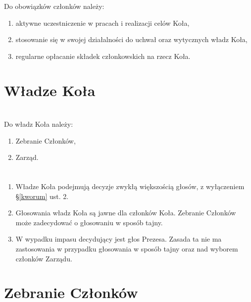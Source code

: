 \documentclass[a4paper]{article}
\begin{document}
\section{}
Do obowiązków członków należy:
\begin{enumerate}[label=\alph*)]
\item aktywne uczestniczenie w pracach i realizacji celów Koła,
\item stosowanie się w swojej działalności do uchwał oraz wytycznych władz Koła,
\item regularne opłacanie składek członkowskich na rzecz Koła.
\end{enumerate}

\section*{Władze Koła~~~}
\section{}

Do władz Koła należy:
\begin{enumerate}[label=\alph*)]
\item Zebranie Członków,
\item Zarząd.
\end{enumerate}

\section{}
\begin{enumerate}
\item Władze Koła podejmują decyzje zwykłą większością głosów, z wyłączeniem \S \ref{kworum} ust. 2.
\item Głosowania władz Koła są jawne dla członków Koła. Zebranie Członków może zadecydować o głosowaniu w sposób tajny.
\item W wypadku impasu decydujący jest głos Prezesa. Zasada ta nie ma zastosowania w przypadku głosowania w sposób tajny oraz nad wyborem członków Zarządu.
\end{enumerate}

\section*{Zebranie Członków~~}
\end{document}
